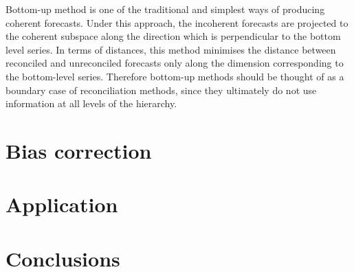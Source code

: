 \documentclass[12pt]{article}
\theoremstyle{definition}
\theoremstyle{property}
\begin{document}
	Bottom-up method is one of the traditional and simplest ways of producing coherent forecasts. Under this approach, the incoherent forecasts are projected to the coherent subspace along the direction which is perpendicular to the bottom level series. In terms of distances, this method minimises the distance between reconciled and unreconciled forecasts only along the dimension corresponding to the bottom-level series. Therefore bottom-up methods should be thought of as a boundary case of reconciliation methods, since they ultimately do not use information at all levels of the hierarchy.   
	
	
	\section{Bias correction}
	
	\section{Application}
	
	\section{Conclusions}
	
	\newpage
	
	
	
	
	
\end{document}
